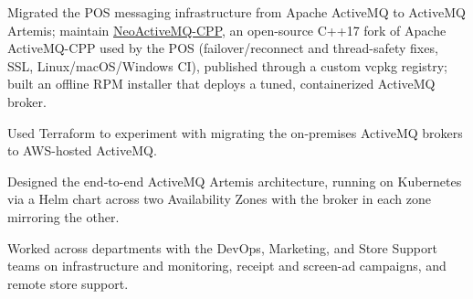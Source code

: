 \begin{cventries}
{\begin{cvitems}
      \item { Migrated the POS messaging infrastructure from Apache ActiveMQ to ActiveMQ Artemis; maintain \href{https://github.com/blackb1rd/neoactivemq-cpp}{NeoActiveMQ-CPP}, an open-source C++17 fork of Apache ActiveMQ-CPP used by the POS (failover/reconnect and thread-safety fixes, SSL, Linux/macOS/Windows CI), published through a custom vcpkg registry; built an offline RPM installer that deploys a tuned, containerized ActiveMQ broker.}
      \item { Used Terraform to experiment with migrating the on-premises ActiveMQ brokers to AWS-hosted ActiveMQ.}
      \item { Designed the end-to-end ActiveMQ Artemis architecture, running on Kubernetes via a Helm chart across two Availability Zones with the broker in each zone mirroring the other.}
      \item { Worked across departments with the DevOps, Marketing, and Store Support teams on infrastructure and monitoring, receipt and screen-ad campaigns, and remote store support.}
      \end{cvitems}
    }


\end{cventries}
